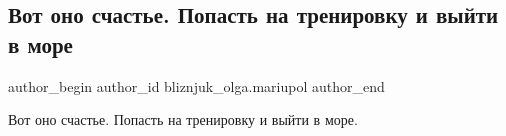  
 
 
 
 

\subsection{Вот оно счастье. Попасть на тренировку и выйти в море}
\label{sec:28_08_2020.fb.bliznjuk_olga.mariupol.1.vot_ono_schaste__pop}

\ifcmt
 author_begin
   author_id bliznjuk_olga.mariupol
 author_end
\fi

Вот оно счастье. Попасть на тренировку и выйти в море.
